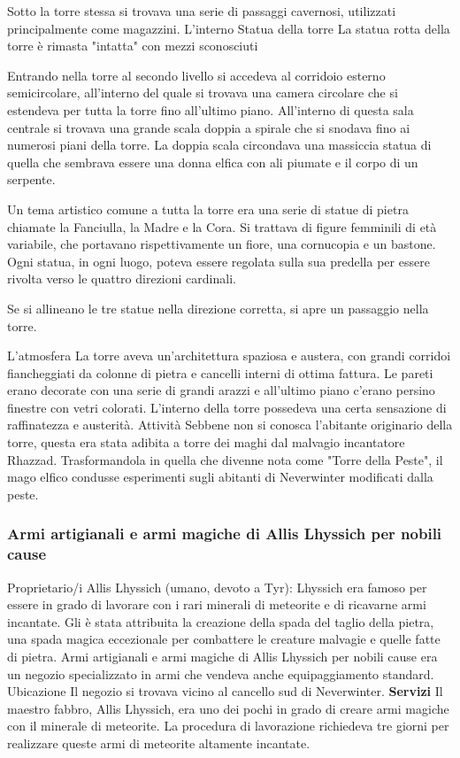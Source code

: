 \documentclass{article}
\begin{document}
Sotto la torre stessa si trovava una serie di passaggi cavernosi, utilizzati principalmente come magazzini.\newline
L'interno\newline
Statua della torre
La statua rotta della torre è rimasta "intatta" con mezzi sconosciuti

Entrando nella torre al secondo livello si accedeva al corridoio esterno semicircolare, all'interno del quale si trovava una camera circolare che si estendeva per tutta la torre fino all'ultimo piano. All'interno di questa sala centrale si trovava una grande scala doppia a spirale che si snodava fino ai numerosi piani della torre. La doppia scala circondava una massiccia statua di quella che sembrava essere una donna elfica con ali piumate e il corpo di un serpente.

Un tema artistico comune a tutta la torre era una serie di statue di pietra chiamate la Fanciulla, la Madre e la Cora. Si trattava di figure femminili di età variabile, che portavano rispettivamente un fiore, una cornucopia e un bastone. Ogni statua, in ogni luogo, poteva essere regolata sulla sua predella per essere rivolta verso le quattro direzioni cardinali.

Se si allineano le tre statue nella direzione corretta, si apre un passaggio nella torre.

L'atmosfera\newline
La torre aveva un'architettura spaziosa e austera, con grandi corridoi fiancheggiati da colonne di pietra e cancelli interni di ottima fattura. Le pareti erano decorate con una serie di grandi arazzi e all'ultimo piano c'erano persino finestre con vetri colorati. L'interno della torre possedeva una certa sensazione di raffinatezza e austerità.\newline
Attività\newline
Sebbene non si conosca l'abitante originario della torre, questa era stata adibita a torre dei maghi dal malvagio incantatore Rhazzad. Trasformandola in quella che divenne nota come "Torre della Peste", il mago elfico condusse esperimenti sugli abitanti di Neverwinter modificati dalla peste.

\subsubsection{Armi artigianali e armi magiche di Allis Lhyssich per nobili cause}
Proprietario/i
Allis Lhyssich (umano, devoto a Tyr): Lhyssich era famoso per essere in grado di lavorare con i rari minerali di meteorite e di ricavarne armi incantate. Gli è stata attribuita la creazione della spada del taglio della pietra, una spada magica eccezionale per combattere le creature malvagie e quelle fatte di pietra.\newline
Armi artigianali e armi magiche di Allis Lhyssich per nobili cause era un negozio specializzato in armi che vendeva anche equipaggiamento standard.
Ubicazione
Il negozio si trovava vicino al cancello sud di Neverwinter.
\textbf{Servizi}
Il maestro fabbro, Allis Lhyssich, era uno dei pochi in grado di creare armi magiche con il minerale di meteorite. La procedura di lavorazione richiedeva tre giorni per realizzare queste armi di meteorite altamente incantate.
\end{document}
